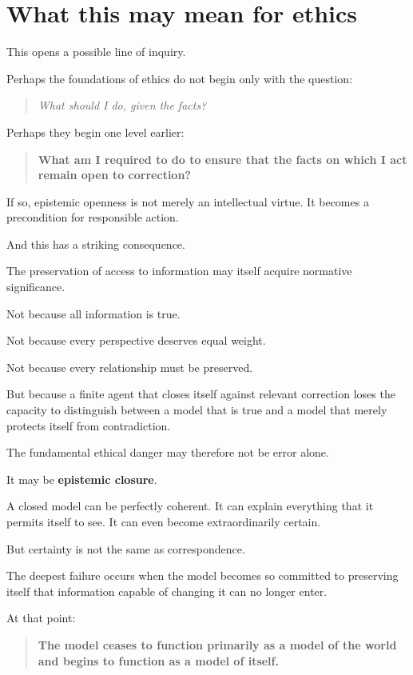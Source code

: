 \documentclass{article}
\begin{document}
\section*{What this may mean for ethics}

This opens a possible line of inquiry.

Perhaps the foundations of ethics do not begin only with the question:

\begin{quote}
    \textit{What should I do, given the facts?}
\end{quote}

Perhaps they begin one level earlier:

\begin{quote}
    \textbf{What am I required to do to ensure that the facts on which I act remain open to correction?}
\end{quote}

If so, epistemic openness is not merely an intellectual virtue. It becomes a precondition for responsible action.

And this has a striking consequence.

The preservation of access to information may itself acquire normative significance.

Not because all information is true.

Not because every perspective deserves equal weight.

Not because every relationship must be preserved.

But because a finite agent that closes itself against relevant correction loses the capacity to distinguish between a model that is true and a model that merely protects itself from contradiction.

The fundamental ethical danger may therefore not be error alone.

It may be \textbf{epistemic closure}.

A closed model can be perfectly coherent. It can explain everything that it permits itself to see. It can even become extraordinarily certain.

But certainty is not the same as correspondence.

The deepest failure occurs when the model becomes so committed to preserving itself that information capable of changing it can no longer enter.

At that point:

\begin{quote}
    \textbf{The model ceases to function primarily as a model of the world and begins to function as a model of itself.}
\end{quote}
\end{document}
